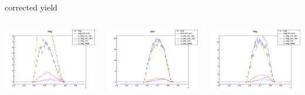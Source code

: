 \begin{frame}{corrected yield}
\begin{columns}
\begin{column}[T]{0.25\textwidth}
\includegraphics[width = \textwidth]{results/yield/statistics_corr/yield_x_Q2_z_0.45_3.898_0.60_neg.png}
\end{column}
\begin{column}[T]{0.25\textwidth}
\includegraphics[width = \textwidth]{results/yield/statistics_corr/yield_x_Q2_z_0.45_3.898_0.70_pos.png}
\end{column}
\begin{column}[T]{0.25\textwidth}
\includegraphics[width = \textwidth]{results/yield/statistics_corr/yield_x_Q2_z_0.45_3.898_0.70_neg.png}
\end{column}
\end{columns}
\end{frame}
